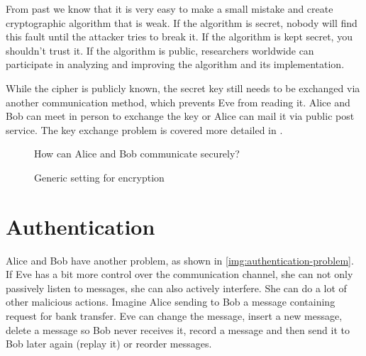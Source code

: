 From past we know that it is very easy to make a small mistake and create cryptographic algorithm that is weak. If the algorithm is secret, nobody will find this fault until the attacker tries to break it. If the algorithm is kept secret, you shouldn't trust it. If the algorithm is public, researchers worldwide can participate in analyzing and improving the algorithm and its implementation.

While the cipher is publicly known, the secret key still needs to be exchanged via another communication method, which prevents Eve from reading it. Alice and Bob can meet in person to exchange the key or Alice can mail it via public post service. The key exchange problem is covered more detailed in .

\begin{figure}
  \centering
  \caption{How can Alice and Bob communicate securely?}
  \label{img:encryption-problem}
\end{figure}

\begin{figure}
  \centering
  \caption{Generic setting for encryption}
  \label{img:encryption}
\end{figure}



\section{Authentication}

Alice and Bob have another problem, as shown in \autoref{img:authentication-problem}. If Eve has a bit more control over the communication channel, she can not only passively listen to messages, she can also actively interfere. She can do a lot of other malicious actions. Imagine Alice sending to Bob a message containing request for bank transfer. Eve can change the message, insert a new message, delete a message so Bob never receives it, record a message and then send it to Bob later again (replay it) or reorder messages.

